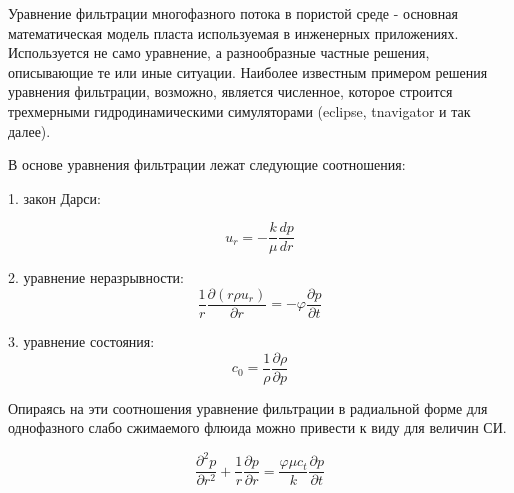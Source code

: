 
Уравнение фильтрации многофазного потока в пористой среде - основная математическая модель пласта используемая в инженерных приложениях. Используется не само уравнение, а разнообразные частные решения, описывающие те или иные ситуации. Наиболее известным примером решения уравнения фильтрации, возможно, является численное, которое строится трехмерными гидродинамическими симуляторами (eclipse, tnavigator и так далее).


В основе уравнения фильтрации лежат следующие соотношения:

1. закон Дарси:  

\begin{equation} \label{eq:darcy_law_1}
	u_r=-\frac{k}{\mu}\frac{dp}{dr} 
\end{equation}


2. уравнение неразрывности: 
\begin{equation} \label{eq:mass_balance_1} 
	\frac{1}{r}\frac{\partial\left(r\rho u_r\right)}{\partial r}=-\varphi\frac{\partial p}{\partial t} 
\end{equation}

3. уравнение состояния: 
\begin{equation} \label{eq:eos_1} 
	c_0=\frac{1}{\rho}\frac{\partial\rho}{\partial p} 
\end{equation}

Опираясь на эти соотношения уравнение фильтрации в радиальной форме для однофазного слабо сжимаемого флюида можно привести к виду для величин СИ.

\begin{equation} \label{eq:diff_eq_1} 
	\frac{\partial ^2 p }{\partial r^2} + \frac{1}{r} \frac{\partial p}{\partial r} = \frac{\varphi \mu c_t}{k} \frac{\partial p}{\partial t} 
\end{equation}

